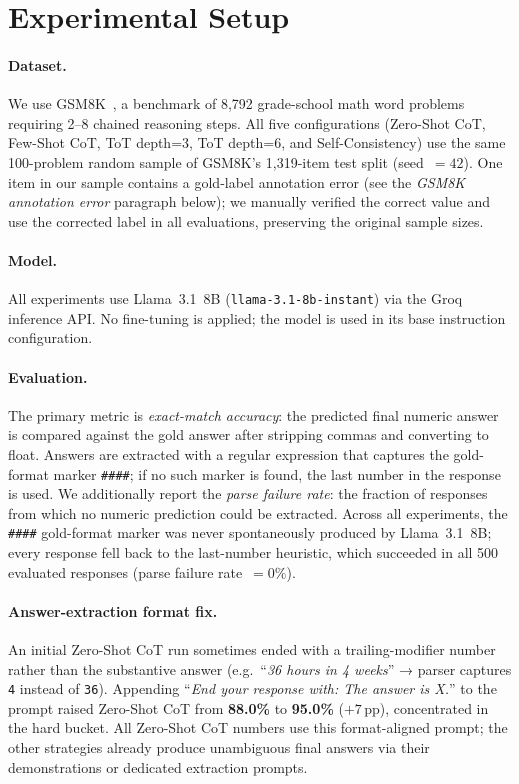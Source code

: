 ﻿\documentclass[runningheads]{llncs}
\begin{document}
\section{Experimental Setup}
\label{sec:setup}

\paragraph{Dataset.}
We use GSM8K~\cite{cobbe2021gsm8k}, a benchmark of 8,792 grade-school
math word problems requiring 2--8 chained reasoning steps.
All five configurations (Zero-Shot CoT, Few-Shot CoT, ToT depth=3,
ToT depth=6, and Self-Consistency) use the same 100-problem random
sample of GSM8K's 1,319-item test split (seed~$= 42$).
One item in our sample contains a gold-label annotation error
(see the \emph{GSM8K annotation error} paragraph below); we manually
verified the correct value and use the corrected label in all
evaluations, preserving the original sample sizes.

\paragraph{Model.}
All experiments use Llama~3.1~8B (\texttt{llama-3.1-8b-instant}) via
the Groq inference API.
No fine-tuning is applied; the model is used in its base instruction
configuration.

\paragraph{Evaluation.}
The primary metric is \textit{exact-match accuracy}: the predicted
final numeric answer is compared against the gold answer after stripping
commas and converting to float.
Answers are extracted with a regular expression that captures the
gold-format marker
\texttt{\#\#\#\#}; if no such marker is found, the last number in
the response is used.
We additionally report the \textit{parse failure rate}: the fraction
of responses from which no numeric prediction could be extracted.
Across all experiments, the \texttt{\#\#\#\#} gold-format marker was
never spontaneously produced by Llama~3.1~8B; every response fell back
to the last-number heuristic, which succeeded in all 500 evaluated
responses (parse failure rate~$= 0\%$).

\paragraph{Answer-extraction format fix.}
An initial Zero-Shot CoT run sometimes ended with a trailing-modifier
number rather than the substantive answer (e.g.\ ``\textit{36 hours
in 4 weeks}'' → parser captures \texttt{4} instead of \texttt{36}).
Appending ``\textit{End your response with: The answer is X.}'' to the
prompt raised Zero-Shot CoT from \textbf{88.0\%} to \textbf{95.0\%}
($+7$\,pp), concentrated in the hard bucket.
All Zero-Shot CoT numbers use this format-aligned prompt; the other
strategies already produce unambiguous final answers via their
demonstrations or dedicated extraction prompts.
\end{document}
